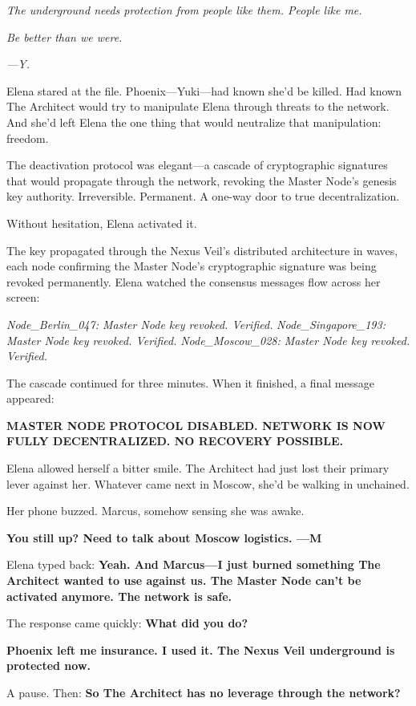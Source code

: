 \documentclass[12pt,letterpaper]{book}
\begin{document}
\emph{The underground needs protection from people like them. People like me.}

\emph{Be better than we were.}

\emph{---Y.}

Elena stared at the file. Phoenix---Yuki---had known she'd be killed. Had known The Architect would try to manipulate Elena through threats to the network. And she'd left Elena the one thing that would neutralize that manipulation: freedom.

The deactivation protocol was elegant---a cascade of cryptographic signatures that would propagate through the network, revoking the Master Node's genesis key authority. Irreversible. Permanent. A one-way door to true decentralization.

Without hesitation, Elena activated it.

The key propagated through the Nexus Veil's distributed architecture in waves, each node confirming the Master Node's cryptographic signature was being revoked permanently. Elena watched the consensus messages flow across her screen:

\emph{Node\_Berlin\_047: Master Node key revoked. Verified.} \emph{Node\_Singapore\_193: Master Node key revoked. Verified.} \emph{Node\_Moscow\_028: Master Node key revoked. Verified.}

The cascade continued for three minutes. When it finished, a final message appeared:

\textbf{MASTER NODE PROTOCOL DISABLED. NETWORK IS NOW FULLY DECENTRALIZED. NO RECOVERY POSSIBLE.}

Elena allowed herself a bitter smile. The Architect had just lost their primary lever against her. Whatever came next in Moscow, she'd be walking in unchained.

Her phone buzzed. Marcus, somehow sensing she was awake.

\textbf{You still up? Need to talk about Moscow logistics. ---M}

Elena typed back: \textbf{Yeah. And Marcus---I just burned something The Architect wanted to use against us. The Master Node can't be activated anymore. The network is safe.}

The response came quickly: \textbf{What did you do?}

\textbf{Phoenix left me insurance. I used it. The Nexus Veil underground is protected now.}

A pause. Then: \textbf{So The Architect has no leverage through the network?}
\end{document}
